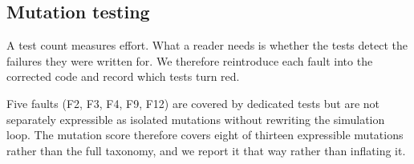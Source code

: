 \documentclass[preprint,12pt,authoryear]{elsarticle}
\begin{document}
\subsection{Mutation testing}
\label{ssec:mutation}

A test count measures effort. What a reader needs is whether the tests detect the
failures they were written for. We therefore reintroduce each fault into the
corrected code and record which tests turn red.

\begin{table}[t]\centering\small
\caption{Mutation results. Every expressible fault is detected; mutation score
$8/8$. The baseline suite is green at $29$ tests.}
\label{tab:mutation}
\end{table}

Five faults (F2, F3, F4, F9, F12) are covered by dedicated tests but are not
separately expressible as isolated mutations without rewriting the simulation
loop. The mutation score therefore covers eight of thirteen expressible
mutations rather than the full taxonomy, and we report it that way rather than
inflating it.
\end{document}
